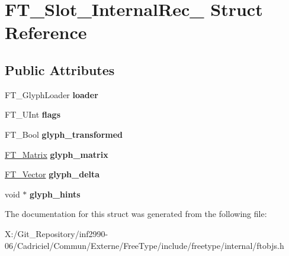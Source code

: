 \hypertarget{struct_f_t___slot___internal_rec__}{\section{F\-T\-\_\-\-Slot\-\_\-\-Internal\-Rec\-\_\- Struct Reference}
\label{struct_f_t___slot___internal_rec__}
}
\subsection*{Public Attributes}
\begin{DoxyCompactItemize}
\item 
\hypertarget{struct_f_t___slot___internal_rec___ac57f8c939f667938ab9f986088c15d8f}{F\-T\-\_\-\-Glyph\-Loader {\bfseries loader}}\label{struct_f_t___slot___internal_rec___ac57f8c939f667938ab9f986088c15d8f}

\item 
\hypertarget{struct_f_t___slot___internal_rec___a9a2a287ba2b363197b36fe24d2f48746}{F\-T\-\_\-\-U\-Int {\bfseries flags}}\label{struct_f_t___slot___internal_rec___a9a2a287ba2b363197b36fe24d2f48746}

\item 
\hypertarget{struct_f_t___slot___internal_rec___ac2bba891ac70016b74c085a05c1f182c}{F\-T\-\_\-\-Bool {\bfseries glyph\-\_\-transformed}}\label{struct_f_t___slot___internal_rec___ac2bba891ac70016b74c085a05c1f182c}

\item 
\hypertarget{struct_f_t___slot___internal_rec___a95af217daf1c2080692b5a69e345aa3b}{\hyperlink{struct_f_t___matrix__}{F\-T\-\_\-\-Matrix} {\bfseries glyph\-\_\-matrix}}\label{struct_f_t___slot___internal_rec___a95af217daf1c2080692b5a69e345aa3b}

\item 
\hypertarget{struct_f_t___slot___internal_rec___a2a94b955dd1e260aaf8699238d44769d}{\hyperlink{struct_f_t___vector__}{F\-T\-\_\-\-Vector} {\bfseries glyph\-\_\-delta}}\label{struct_f_t___slot___internal_rec___a2a94b955dd1e260aaf8699238d44769d}

\item 
\hypertarget{struct_f_t___slot___internal_rec___a16337853823cdccfb0c636673c4eb3ae}{void $\ast$ {\bfseries glyph\-\_\-hints}}\label{struct_f_t___slot___internal_rec___a16337853823cdccfb0c636673c4eb3ae}

\end{DoxyCompactItemize}


The documentation for this struct was generated from the following file\-:\begin{DoxyCompactItemize}
\item 
X\-:/\-Git\-\_\-\-Repository/inf2990-\/06/\-Cadriciel/\-Commun/\-Externe/\-Free\-Type/include/freetype/internal/ftobjs.\-h\end{DoxyCompactItemize}
